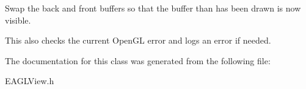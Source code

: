 Swap the back and front buffers so that the buffer than has been drawn is now visible. 

This also checks the current OpenGL error and logs an error if needed. 

The documentation for this class was generated from the following file:\begin{DoxyCompactItemize}
\item 
EAGLView.h\end{DoxyCompactItemize}
